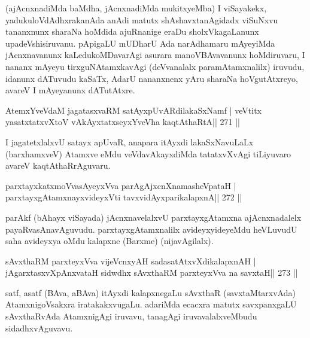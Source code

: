 \begin{artha}
(ajAcnxnadiMda baMdha, jAcnxnadiMda mukitxyeMba) I viSayakekx, yadukuloVdAdhxrakanAda anAdi matutx shAshavxtanAgidadx viSuNxvu tananxnunx sharaNa hoMdida ajuRnanige eraDu sholxVkagaLanunx upadeVshisiruvanu. pApigaLU mUDharU Ada narAdhamaru mAyeyiMda jAcnxnavanunx kaLedukoMDavarAgi asurara manoVBAvavanunx hoMdiruvaru, I nananx mAyeyu tirxguNAtamxkavAgi (deVvanalalx paramAtamxnalilx) iruvudu, idanunx dATuvudu kaSaTx, AdarU nananxnenx yAru sharaNa hoVgutAtxreyo, avareV I mAyeyanunx dATutAtxre.
\end{artha}
 

\begin{shl}
AtemxYveVdaM jagatasxvaRM satAyxpUvARdilakaSxNamf |
veVtitx yasatxtatxvXtoV vAkAyxtatxseyxYveVha kaqtAthaRtA\hfill || 271 ||
\end{shl}

\begin{artha}
I jagatetxlalxvU satayx apUvaR, anapara itAyxdi lakaSxNavuLaLx  (barxhamxveV) Atamxve eMdu veVdavAkayxdiMda tatatxvXvAgi tiLiyuvaro avareV kaqtAthaRrAguvaru.
\end{artha}

\begin{shl}
parxtayxkatxmoVvasAyeyxVva parAgAjxcnXnamasheVpataH |
parxtayxgAtamxnayxvideyxVti tavxvidAyxparikalapxnA\hfill || 272 ||
\end{shl}

\begin{artha}
parAkf (bAhayx viSayada) jAcnxnavelalxvU parxtayxgAtamxna  ajAcnxnadalelx payaRvasAnavAguvudu. parxtayxgAtamxnalilx avideyxyideyeMdu heVLuvudU saha avideyxya oMdu kalapxne (Barxme) (nijavAgilalx).
\end{artha}

\begin{shl}
sAvxthaRM parxteyxVva vijeVcnxyAH sadasatAtxvXdikalapxnAH |
jAgarxtasxvXpAnxvataH sidwdhx sAvxthaRM parxteyxVva na savxtaH\hfill || 273 ||
\end{shl}

\begin{artha}
satf, asatf (BAva, aBAva) itAyxdi kalapxnegaLu sAvxthaR  (savxtaMtarxvAda) AtamxnigoVsakxra iratakakxvugaLu. adariMda ecacxra  matutx savxpanxgaLU sAvxthaRvAda AtamxnigAgi iruvavu, tanagAgi iruvavalalxveMbudu sidadhxvAguvavu.
\end{artha}


